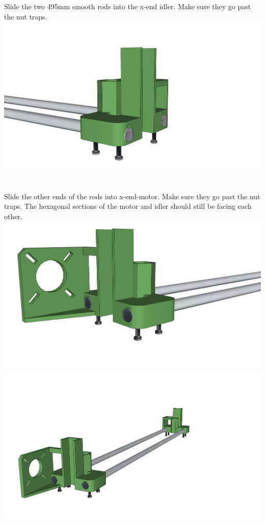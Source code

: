 \documentclass[twoside,a4paper,titlepage]{memoir}
\begin{document}
	\section{}
	Slide the two 495mm smooth rods into the x-end idler. Make sure they go past the nut traps.\\
	\includegraphics[width=1\linewidth]{graphics/ch7_6.png}
	
	\section{}
	Slide the other ends of the rods into x-end-motor. Make sure they go past the nut traps. The hexagonal
	sections of the motor and idler should still be facing each other.\\
	\includegraphics[width=1\linewidth]{graphics/ch7_7_1.png}
	\includegraphics[width=1\linewidth]{graphics/ch7_7_2.png}
	
\end{document}
